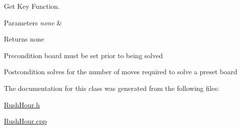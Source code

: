 Get Key Function. 


\begin{DoxyParams}{Parameters}
{\em none} & \\
\hline
\end{DoxyParams}
\begin{DoxyReturn}{Returns}
none
\end{DoxyReturn}
\begin{DoxyPrecond}{Precondition}
board must be set prior to being solved 
\end{DoxyPrecond}
\begin{DoxyPostcond}{Postcondition}
solves for the number of moves required to solve a preset board 
\end{DoxyPostcond}


The documentation for this class was generated from the following files\+:\begin{DoxyCompactItemize}
\item 
\hyperlink{_rush_hour_8h}{Rush\+Hour.\+h}\item 
\hyperlink{_rush_hour_8cpp}{Rush\+Hour.\+cpp}\end{DoxyCompactItemize}
